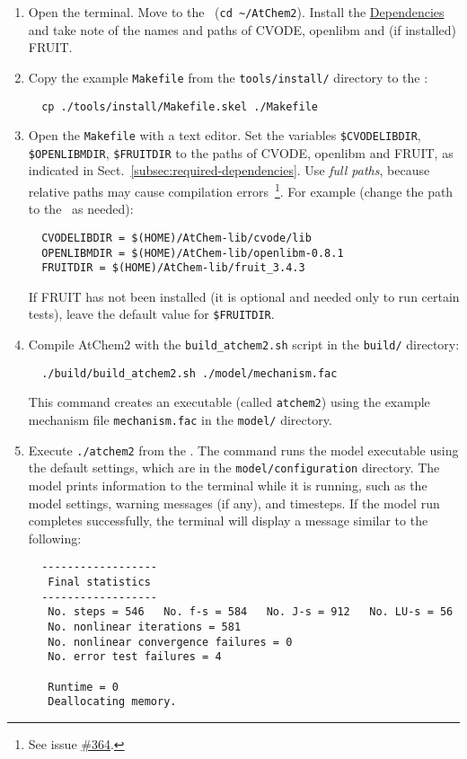 \begin{enumerate}
\item Open the terminal. Move to the \maindir\ (\verb|cd ~/AtChem2|).
  Install the \hyperref[sec:dependencies]{Dependencies} and take note
  of the names and paths of CVODE, openlibm and (if installed) FRUIT.
\item Copy the example \texttt{Makefile} from the \texttt{tools/install/}
  directory to the \maindir:
  \begin{verbatim}
  cp ./tools/install/Makefile.skel ./Makefile
  \end{verbatim}
\item Open the \texttt{Makefile} with a text editor. Set the variables
  \texttt{\$CVODELIBDIR}, \texttt{\$OPENLIBMDIR}, \texttt{\$FRUITDIR}
  to the paths of CVODE, openlibm and FRUIT, as indicated in
  Sect.~\ref{subsec:required-dependencies}. Use \emph{full paths},
  because relative paths may cause compilation errors~\footnote{See
    issue \href{https://github.com/AtChem/AtChem2/issues/364}{\#364}.}.
  For example (change the path to the \depdir\ as needed):
  \begin{verbatim}
  CVODELIBDIR = $(HOME)/AtChem-lib/cvode/lib
  OPENLIBMDIR = $(HOME)/AtChem-lib/openlibm-0.8.1
  FRUITDIR = $(HOME)/AtChem-lib/fruit_3.4.3
  \end{verbatim}
  If FRUIT has not been installed (it is optional and needed only to
  run certain tests), leave the default value for \texttt{\$FRUITDIR}.
\item Compile AtChem2 with the \texttt{build\_atchem2.sh} script in
  the \texttt{build/} directory:
  \begin{verbatim}
  ./build/build_atchem2.sh ./model/mechanism.fac
  \end{verbatim}
  This command creates an executable (called \texttt{atchem2}) using
  the example mechanism file \texttt{mechanism.fac} in the
  \texttt{model/} directory.
\item Execute \verb|./atchem2| from the \maindir. The command runs the
  model executable using the default settings, which are in the
  \texttt{model/configuration} directory. The model prints information
  to the terminal while it is running, such as the model settings,
  warning messages (if any), and timesteps. If the model run completes
  successfully, the terminal will display a message similar to the
  following:
  \begin{verbatim}
  ------------------
   Final statistics
  ------------------
   No. steps = 546   No. f-s = 584   No. J-s = 912   No. LU-s = 56
   No. nonlinear iterations = 581
   No. nonlinear convergence failures = 0
   No. error test failures = 4

   Runtime = 0
   Deallocating memory.
  \end{verbatim}
\end{enumerate}

